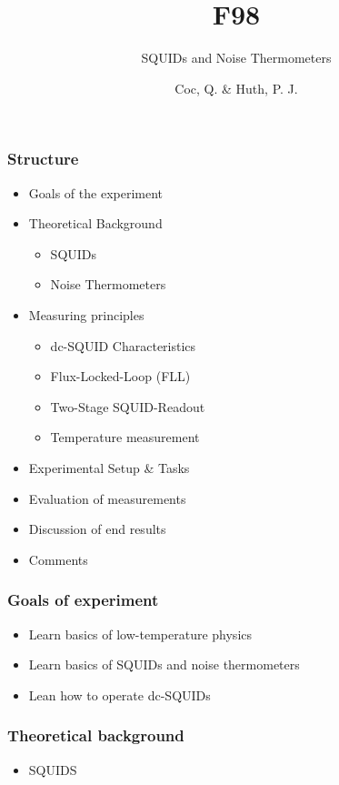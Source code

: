 \documentclass[16pt]{beamer}
\begin{document}
	\author{Coc, Q. \& Huth, P. J.}
	\title{F98}
	\subtitle{SQUIDs and Noise Thermometers}
	\begin{frame}[plain]
		\maketitle
	\end{frame}
	
	\begin{frame}
		\frametitle{Structure}
		\begin{itemize}
			\item Goals of the experiment		
			\item Theoretical Background 
			\begin{itemize}
				\item SQUIDs
				\item Noise Thermometers
			\end{itemize}
			\item Measuring principles
			\begin{itemize}
				\item dc-SQUID Characteristics
				\item Flux-Locked-Loop (FLL)
				\item Two-Stage SQUID-Readout
				\item Temperature measurement
			\end{itemize}
			\item Experimental Setup \& Tasks
			\item Evaluation of measurements
			\item Discussion of end results
			\item Comments 
		\end{itemize}
	\end{frame}

	\begin{frame}
		\frametitle{Goals of experiment}
		\begin{itemize}
			\item Learn basics of low-temperature physics
			\item Learn basics of SQUIDs and noise thermometers
			\item Lean how to operate dc-SQUIDs
		\end{itemize}
	\end{frame}

	\begin{frame}
		\frametitle{Theoretical background}
	\begin{itemize}
	\item SQUIDS
	\end{itemize}		
	\end{frame}
	
\end{document}
